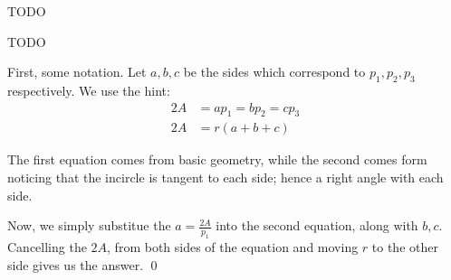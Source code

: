\begin{Exercise}
	TODO
\end{Exercise}

\begin{Exercise}
	TODO
\end{Exercise}

\begin{Exercise}
	First, some notation.
	Let $a,b,c$ be the sides which correspond to $p_1, p_2, p_3$ respectively. 
	We use the hint:
	\begin{align}
		2A &= ap_1 = bp_2 = cp_3 \\
		2A &= r(a + b + c)
	\end{align}

	The first equation comes from basic geometry, while the second comes form noticing that the incircle is tangent to each side; hence a right angle with each side.

	Now, we simply substitue the $a = \frac{2A}{p_1}$ into the second equation, along with $b, c$.
	Cancelling the $2A$, from both sides of the equation and moving $r$ to the other side gives us the answer. \qed
\end{Exercise}

